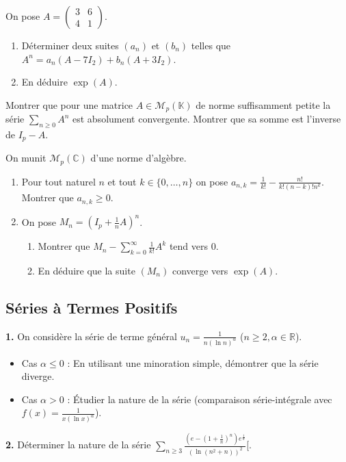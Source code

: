 \begin{exercice}
On pose $A=\begin{pmatrix}3&6\\ 4&1\end{pmatrix}$.
\begin{enumerate}
    \item Déterminer deux suites $(a_{n})$ et $(b_{n})$ telles que $A^{n}=a_{n}(A-7I_{2})+b_{n}(A+3I_{2})$.
    \item En déduire $\exp(A)$.
\end{enumerate}
\end{exercice}

\begin{exercice}
Montrer que pour une matrice $A\in \mathcal{M}_{p}(\mathbb{K})$ de norme suffisamment petite la série $\sum_{n\ge0}A^{n}$ est absolument convergente. Montrer que sa somme est l'inverse de $I_{p}-A$.
\end{exercice}

\begin{exercice}
On munit $\mathcal{M}_{p}(\mathbb{C})$ d'une norme d'algèbre.
\begin{enumerate}
    \item Pour tout naturel $n$ et tout $k\in\{0,\dots,n\}$ on pose $a_{n,k}=\frac{1}{k!}-\frac{n!}{k!(n-k)!n^{k}}$. Montrer que $a_{n,k}\ge0$.
    \item On pose $M_{n}=(I_{p}+\frac{1}{n}A)^{n}$.
    \begin{enumerate}
        \item Montrer que $M_{n}-\sum_{k=0}^{\infty}\frac{1}{k!}A^{k}$ tend vers 0.
        \item En déduire que la suite $(M_{n})$ converge vers $\exp(A)$.
    \end{enumerate}
\end{enumerate}
\end{exercice}

\subsection{Séries à Termes Positifs}

\begin{exercice}
\textbf{1.} On considère la série de terme général $u_{n}=\frac{1}{n(\ln n)^{\alpha}}$ ($n\ge2, \alpha\in\mathbb{R}$).
\begin{itemize}
    \item Cas $\alpha\le0$ : En utilisant une minoration simple, démontrer que la série diverge.
    \item Cas $\alpha>0$ : Étudier la nature de la série (comparaison série-intégrale avec $f(x)=\frac{1}{x(\ln x)^{\alpha}}$).
\end{itemize}
\textbf{2.} Déterminer la nature de la série $\sum_{n\ge3}\frac{(e-(1+\frac{1}{n})^{n})e^{\frac{1}{n}}}{(\ln(n^{2}+n))^{2}}$[.
\end{exercice}

